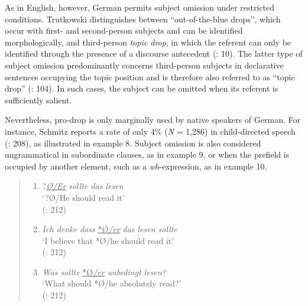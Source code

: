 \documentclass[
  letterpaper,
  DIV=11,
  numbers=noendperiod]{scrartcl}
\begin{document}
As in English, however, German permits subject omission under restricted
conditions. Trutkowski distinguishes between ``out-of-the-blue drops'',
which occur with first- and second-person subjects and can be identified
morphologically, and third-person \emph{topic drop}, in which the
referent can only be identified through the presence of a discourse
antecedent (: 10).
The latter type of subject omission predominantly concerns third-person
subjects in declarative sentences occupying the topic position and is
therefore also referred to as ``topic drop''
(: 104). In such
cases, the subject can be omitted when its referent is sufficiently
salient.

Nevertheless, pro-drop is only marginally used by native speakers of
German. For instance, Schmitz reports a rate of only 4\% (\emph{N} =
1,286) in child-directed speech
(: 208),
as illustrated in example 8. Subject omission is also considered
ungrammatical in subordinate clauses, as in example 9, or when the
prefield is occupied by another element, such as a \emph{wh}-expression,
as in example 10.

\begin{quote}
\begin{enumerate}
\def\labelenumi{(\arabic{enumi})}
\setcounter{enumi}{7}
\item
  ?\ul{\emph{Ø/Er}} \emph{sollte das lesen}\\
  `?Ø/He should read it'\\
  (: 212)
\item
  \emph{Ich denke dass} \ul{*Ø\emph{/er}} \emph{das lesen sollte}\\
  `I believe that *Ø/he should read it'\\
  (: 212)
\item
  \emph{Was sollte} \ul{*Ø\emph{/er}} \emph{unbedingt lesen?}\\
  `What should *Ø/he absolutely read?'\\
  (: 212)
\end{enumerate}
\end{quote}
\end{document}
